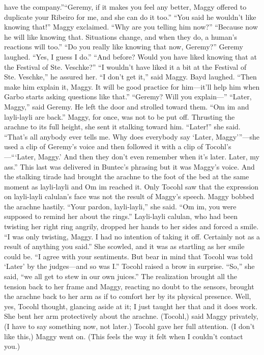 \documentclass[9pt]{article}
\begin{document}
have the company.”“Geremy, if it makes you feel any better, Maggy offered to duplicate your Ribeiro for me, and she
can do it too.”
“You said he wouldn’t like knowing that!” Maggy exclaimed. “Why are you telling him now?”
“Because now he will like knowing that. Situations change, and when they do, a human’s reactions
will too.”
“Do you really like knowing that now, Geremy?”
Geremy laughed. “Yes, I guess I do.”
“And before? Would you have liked knowing that at the Festival of Ste. Veschke?”
“I wouldn’t have liked it a bit at the Festival of Ste. Veschke,” he assured her.
“I don’t get it,” said Maggy.
Bayd laughed. “Then make him explain it, Maggy. It will be good practice for him—it’ll help him
when Garbo starts asking questions like that.”
“Geremy? Will you explain—”
“Later, Maggy,” said Geremy. He left the door and strolled toward them. “Om im and layli-layli are
back.”
Maggy, for once, was not to be put off. Thrusting the arachne to its full height, she sent it stalking
toward him. “Later!” she said. “That’s all anybody ever tells me. Why does everybody say ‘Later,
Maggy’”—she used a clip of Geremy’s voice and then followed it with a clip of Tocohl’s—“‘Later,
Maggy.’ And then they don’t even remember when it’s later. Later, my ass.”
This last was delivered in Buntec’s phrasing but it was Maggy’s voice. And the stalking tirade had
brought the arachne to the foot of the bed at the same moment as layli-layli and Om im reached it.
Only Tocohl saw that the expression on layli-layli calulan’s face was not the result of Maggy’s
speech. Maggy bobbed the arachne hastily. “Your pardon, layli-layli,” she said. “Om im, you were
supposed to remind her about the rings.”
Layli-layli calulan, who had been twisting her right ring angrily, dropped her hands to her sides and
forced a smile. “I was only twisting, Maggy. I had no intention of taking it off. Certainly not as a result of
anything you said.” She scowled, and it was as startling as her smile could be. “I agree with your
sentiments. But bear in mind that Tocohl was told ‘Later’ by the judges—and so was I.”
Tocohl raised a brow in surprise. “So,” she said, “we all get to stew in our own juices.” The
realization brought all the tension back to her frame and Maggy, reacting no doubt to the sensors,
brought the arachne back to her arm as if to comfort her by its physical presence. Well, yes, Tocohl
thought, glancing aside at it; I just taught her that and it does work. She bent her arm protectively about
the arachne.
(Tocohl,) said Maggy privately, (I have to say something now, not later.) Tocohl gave her full
attention. (I don’t like this,) Maggy went on. (This feels the way it felt when I couldn’t contact you.)
\end{document}
